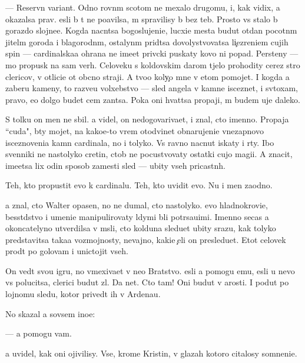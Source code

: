 \documentclass[10pt]{book}
\begin{document}
— Reservn{\yi}{\y} variant. Odno rovn{\yi}m scotom ne mexalo drugomu, i, kak vidix, {\y}a okazalsa prav. {\Y}esli b{\yi} t{\yi} ne po{\y}avilsa, m{\yi} spravilisy b{\yi} bez teb{\ia}. Prosto vs{\e} stalo b{\yi} gorazdo slojne{\y}e. Kogda nacn{\e}tsa bogoslujeni{\y}e, lucxi{\y}e mesta budut otdan{\yi} pocotn{\yi}m jitel{\ia}m goroda i blagorodn{\yi}m, ostalyn{\yi}m prid{\e}tsa dovolystvovatsa li{\c}ezreni{\y}em cujih spin — cardinalska{\y}a ohrana ne ime{\y}et priv{\yi}cki puskaty kovo ni popad{\ia}. Persteny — mo{\y} propusk na sam{\yi}{\y} verh. Celoveku s koldovskim darom t{\ia}jelo prohodity cerez stro{\y} clericov, v otlici{\y}e ot ob{\yi}cno{\y} straji. A tvo{\y}o koly{\c}o mne v etom pomojet. I kogda {\y}a zaberu kameny, to razve{\y}u volxebstvo — sled angela v kamne isceznet, i sv{\ia}toxam, pravo, {\y}e{\x}o dolgo budet cem zan{\ia}tsa. Poka oni hvat{\ia}tsa propaji, m{\yi} budem uje daleko.

S tolku on men{\ia} ne sbil. {\Y}a videl, on nedogovariva{\y}et, i znal, cto imenno. Propaja ``cuda", b{\yi}ty mojet, na kako{\y}e-to vrem{\ia} otodvinet obnarujeni{\y}e vnezapnovo isceznoveni{\y}a kamn{\ia} cardinala, no i tolyko. Vs{\e} ravno nacnut iskaty i r{\yi}ty. Ibo sv{\ia}{\x}enniki ne nastolyko cretin{\yi}, ctob{\yi} ne pocustvovaty ostatki cujo{\y} magi{\y}i. A znacit, ime{\y}etsa lix odin sposob zamesti sled{\yi} — ubity vseh pricastn{\yi}h.

Teh, kto propustit {\y}evo k cardinalu. Teh, kto uvidit {\y}evo. Nu i men{\ia} zaodno.

{\Y}a znal, cto Walter opasen, no ne dumal, cto nastolyko. {\Y}evo hladnokrovi{\y}e, besst{\yi}dstvo i umeni{\y}e manipulirovaty l{\io}dymi b{\yi}li potr{\ia}sa{\y}u{\x}imi. Imenno se{\y}cas {\y}a okoncatelyno utverdilsa v m{\yi}sli, cto kolduna sledu{\y}et ubity srazu, kak tolyko predstavitsa taka{\y}a vozmojnosty, nevajno, kaki{\y}e {\c}eli on presledu{\y}et. Etot celovek pro{\y}d{\e}t po golovam i unictojit vseh.

On ved{\e}t svo{\y}u igru, no vmexiva{\y}et v ne{\y}o Bratstvo. {\Y}esli {\y}a pomogu {\y}emu, {\y}esli u nevo vs{\e} polucitsa, clerici budut zl{\yi}. Da net. Cto tam! Oni budut v {\y}arosti. I po{\y}dut po lojnomu sledu, kotor{\yi}{\y} prived{\e}t ih v Ardenau.

No skazal {\y}a sovsem ino{\y}e:

— {\Y}a pomogu vam.

{\Y}a uvidel, kak oni ojivilisy. Vse, krome Kristin{\yi}, v glazah kotoro{\y} citalosy somneni{\y}e.
\end{document}
